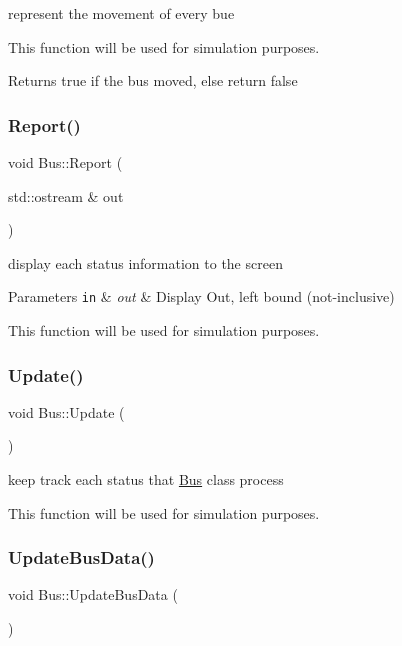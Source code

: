 represent the movement of every bue 

This function will be used for simulation purposes.

\begin{DoxyReturn}{Returns}
true if the bus moved, else return false 
\end{DoxyReturn}
\mbox{\label{classBus_a4e50209dde52bff3de231c8259b38982}} 
\subsubsection{\texorpdfstring{Report()}{Report()}}
{\footnotesize\ttfamily void Bus\+::\+Report (\begin{DoxyParamCaption}\item[{std\+::ostream \&}]{out }\end{DoxyParamCaption})}



display each status information to the screen 


\begin{DoxyParams}[1]{Parameters}
\mbox{\tt in}  & {\em out} & Display Out, left bound (not-\/inclusive)\\
\hline
\end{DoxyParams}
This function will be used for simulation purposes. \mbox{\label{classBus_a9896f74f16966f7621d0dfafff0ec6b4}} 
\subsubsection{\texorpdfstring{Update()}{Update()}}
{\footnotesize\ttfamily void Bus\+::\+Update (\begin{DoxyParamCaption}{ }\end{DoxyParamCaption})}



keep track each status that \hyperlink{classBus}{Bus} class process 

This function will be used for simulation purposes. \mbox{\label{classBus_a38b7ee7b13b3438894e914a6933a6f44}} 
\subsubsection{\texorpdfstring{Update\+Bus\+Data()}{UpdateBusData()}}
{\footnotesize\ttfamily void Bus\+::\+Update\+Bus\+Data (\begin{DoxyParamCaption}{ }\end{DoxyParamCaption})}



